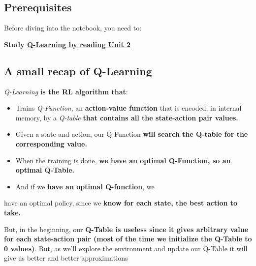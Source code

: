 \documentclass[11pt,a4paper]{article}
\begin{document}
\subsection{Prerequisites}\label{prerequisites}

Before diving into the notebook, you need to:

\textbf{Study \href{https://huggingface.co/deep-rl-course/unit2/introduction}{Q-Learning by reading Unit 2}}

\subsection{A small recap of Q-Learning}\label{a-small-recap-of-q-learning}

\emph{Q-Learning} \textbf{is the RL algorithm that}:

\begin{itemize}
\item
  Trains \emph{Q-Function}, an \textbf{action-value function} that is encoded, in internal memory, by a \emph{Q-table} \textbf{that contains all the state-action pair values.}
\item
  Given a state and action, our Q-Function \textbf{will search the Q-table for the corresponding value.}
\end{itemize}


\begin{itemize}
\item
  When the training is done, \textbf{we have an optimal Q-Function, so an optimal Q-Table.}
\item
  And if we \textbf{have an optimal Q-function}, we
\end{itemize}

have an optimal policy, since we \textbf{know for each state, the best action to take.}


But, in the beginning, our \textbf{Q-Table is useless since it gives arbitrary value for each state-action pair (most of the time we initialize the Q-Table to 0 values)}. But, as we'll explore the environment and update our Q-Table it will give us better and better approximations
\end{document}
